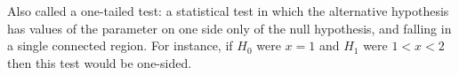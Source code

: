Also called a one-tailed test: a statistical test in which the alternative
hypothesis has values of the parameter on one side only of the null hypothesis,
and falling in a single connected region. For instance, if $H_{0}$  were
$x=1$ and $H_{1}$  were $1 < x < 2$ then this test would be one-sided.